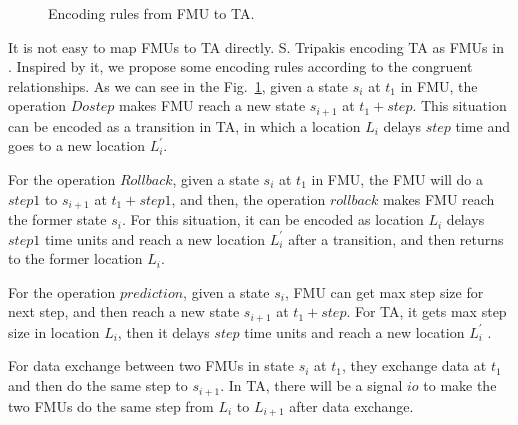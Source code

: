 \begin{figure}[htbp]
	\caption{Encoding rules from FMU to TA.}
	\label{fmutota}
\end{figure}

It is not easy to map FMUs to TA directly. S. Tripakis encoding TA as FMUs in \cite{Tripakis15}. Inspired by it, we propose some encoding rules according to the congruent relationships. As we can see in the Fig.~\ref{fmutota}, given a state $s_{i}$ at $t_{1}$ in FMU, the operation $Dostep$ makes FMU reach a new state $s_{i+1}$ at $t_{1}+step$. This situation can be encoded as a transition in TA, in which a location $L_{i}$ delays $step$ time and goes to a new location $L_{i}^{\prime}$.

For the operation $Rollback$, given a state $s_{i}$ at $t_{1}$ in FMU, the FMU will do a $step1$ to $s_{i+1}$ at $t_{1}+step1$, and then, the operation $rollback$ makes FMU reach the former state $s_{i}$. For this situation, it can be encoded as location $L_{i}$ delays $step1$ time units and reach a new location $L_{i}^{\prime}$ after a transition, and then returns to the former location $L_{i}$. 

For the operation $prediction$, given a state $s_{i}$, FMU can get max step size for next step, and then reach a new state $s_{i+1}$ at $t_{1}+step$. For TA, it gets max step size in location $L_{i}$, then it delays $step$ time units and reach a new location $L_{i}^{\prime}$ .

For data exchange between two FMUs in state $s_{i}$ at $t_{1}$, they exchange data at $t_{1}$ and then do the same step to $s_{i+1}$. In TA, there will be a signal $io$ to make the two FMUs do the same step from $L_{i}$ to $L_{i+1}$ after data exchange.

